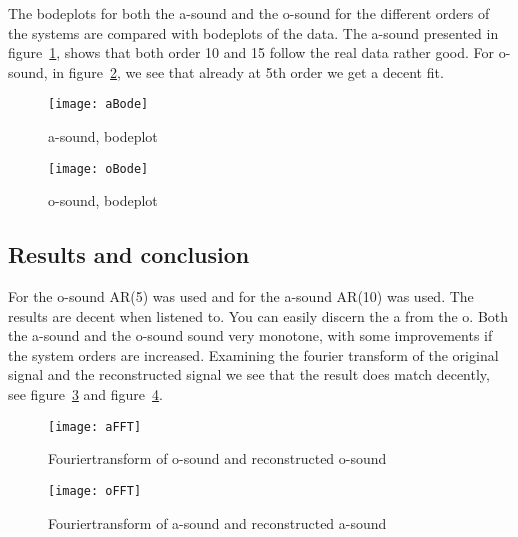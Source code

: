 \documentclass[10pt]{article}
\begin{document}
The bodeplots for both the a-sound and the o-sound for the different orders of
the systems are compared with bodeplots of the data. The a-sound presented in
figure~\ref{fig:aBode}, shows that both order 10 and 15 follow the real data
rather good. For o-sound, in figure~\ref{fig:oBode}, we see that already at
5th order we get a decent fit.


\begin{figure}[!hp]

    \begin{center}
      \texttt{[image: aBode]}
    \caption{a-sound, bodeplot \label{fig:aBode}}
    \end{center}

\end{figure}

\begin{figure}[!hp]

    \begin{center}
      \texttt{[image: oBode]}
    \caption{o-sound, bodeplot \label{fig:oBode}}
    \end{center}
\end{figure}

\subsection{Results and conclusion}
For the o-sound AR(5) was used and for the a-sound AR(10) was used.
The results are decent when listened to. You can easily discern the a from the o.
Both the a-sound and the o-sound sound very monotone, with some improvements if
the system orders are increased.
Examining the fourier transform of the original signal and the reconstructed
signal we see that the result does match decently, see figure~\ref{fig:ffto} and
figure~\ref{fig:ffta}.


\begin{figure}[!hp]

    \begin{center}
      \texttt{[image: aFFT]}
    \caption{Fouriertransform of o-sound and reconstructed o-sound \label{fig:ffto}}
    \end{center}

\end{figure}

\begin{figure}[!hp]

    \begin{center}
      \texttt{[image: oFFT]}
    \caption{Fouriertransform of a-sound and reconstructed a-sound \label{fig:ffta}}
    \end{center}

\end{figure}
\end{document}
